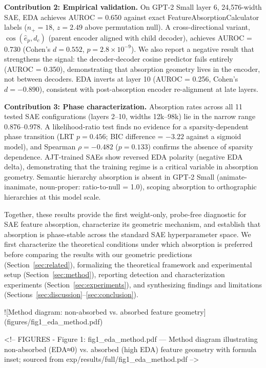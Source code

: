 \documentclass{article}
\begin{document}
\textbf{Contribution 2: Empirical validation.} On GPT-2 Small layer 6, 24,576-width SAE,
EDA achieves AUROC = 0.650 against exact FeatureAbsorptionCalculator labels ($n_+ = 18$,
$z = 2.49$ above permutation null). A cross-directional variant, $\cos(\hat{e}_p, d_c)$
(parent encoder aligned with child decoder), achieves AUROC = 0.730 (Cohen's $d = 0.552$,
$p = 2.8 \times 10^{-9}$). We also report a negative result that strengthens the signal:
the decoder-decoder cosine predictor fails entirely (AUROC = 0.350), demonstrating that
absorption geometry lives in the encoder, not between decoders. EDA inverts at layer 10
(AUROC = 0.256, Cohen's $d = -0.890$), consistent with post-absorption encoder re-alignment
at late layers.

\textbf{Contribution 3: Phase characterization.} Absorption rates across all 11 tested SAE
configurations (layers 2--10, widths 12k--98k) lie in the narrow range 0.876--0.978.
A likelihood-ratio test finds no evidence for a sparsity-dependent phase transition
(LRT $p = 0.456$; BIC difference = $-3.22$ against a sigmoid model), and Spearman
$\rho = -0.482$ ($p = 0.133$) confirms the absence of sparsity dependence. AJT-trained SAEs
show reversed EDA polarity (negative EDA delta), demonstrating that the training regime
is a critical variable in absorption geometry. Semantic hierarchy absorption is absent in
GPT-2 Small (animate-inanimate, noun-proper: ratio-to-null = 1.0), scoping absorption to
orthographic hierarchies at this model scale.

Together, these results provide the first weight-only, probe-free diagnostic for SAE feature
absorption, characterize its geometric mechanism, and establish that absorption is phase-stable
across the standard SAE hyperparameter space. We first characterize the theoretical conditions
under which absorption is preferred before comparing the results with our geometric predictions
(Section~\ref{sec:related}), formalizing the theoretical framework and experimental setup
(Section~\ref{sec:method}), reporting detection and characterization experiments
(Section~\ref{sec:experiments}), and synthesizing findings and limitations
(Sections~\ref{sec:discussion}--\ref{sec:conclusion}).

![Method diagram: non-absorbed vs. absorbed feature geometry](figures/fig1_eda_method.pdf)

<!-- FIGURES
- Figure 1: fig1_eda_method.pdf — Method diagram illustrating non-absorbed (EDA≈0) vs. absorbed (high EDA) feature geometry with formula inset; sourced from exp/results/full/fig1_eda_method.pdf
-->
\end{document}
